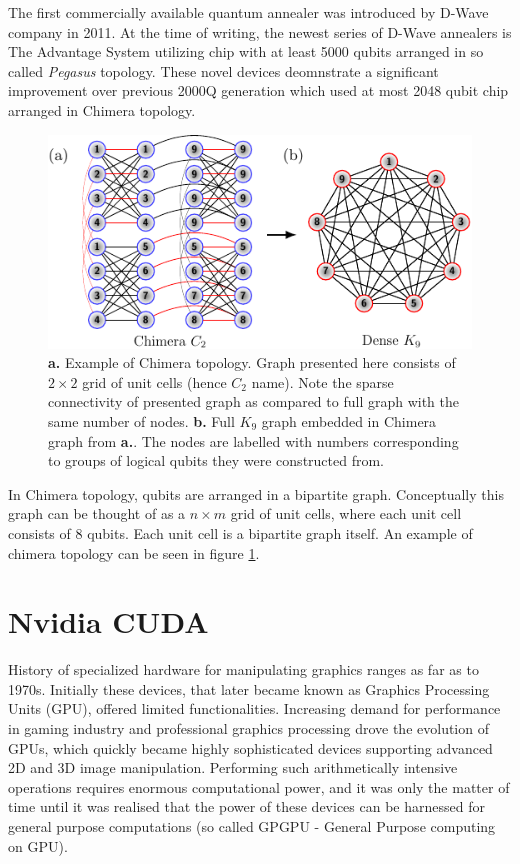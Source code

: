 The first commercially available quantum annealer was introduced by D-Wave company in 2011. At the time of writing, the newest series of D-Wave annealers is The Advantage System utilizing chip with at least 5000 qubits arranged in so called \emph{Pegasus} topology. These novel devices deomnstrate a significant improvement over previous 2000Q generation which used at most 2048 qubit chip arranged in Chimera topology.

\begin{figure}[h]
    \centering
    \includegraphics[width=\textwidth]{figures/chimera.pdf}
    \caption{\textbf{a.} Example of Chimera topology. Graph presented here consists of $2 \times 2$ grid of unit cells (hence $C_2$ name). Note the sparse connectivity of presented graph as compared to full graph with the same number of nodes. \textbf{b.} Full $K_9$ graph embedded in Chimera graph from \textbf{a.}. The nodes are labelled with numbers corresponding to groups of logical qubits they were constructed from.}
    \label{fig:chimera}
\end{figure}

In Chimera topology, qubits are arranged in a bipartite graph. Conceptually this graph can be thought of as a $n \times m$ grid of unit cells, where each unit cell consists of $8$ qubits. Each unit cell is a bipartite graph itself. An example of chimera topology can be seen in figure \ref{fig:chimera}.

\section{Nvidia CUDA}
History of specialized hardware for manipulating graphics ranges as far as to 1970s. Initially these devices, that later became known as Graphics Processing Units (GPU), offered limited functionalities. Increasing demand for performance in gaming industry and professional graphics processing drove the evolution of GPUs, which quickly became highly sophisticated devices supporting advanced 2D and 3D image manipulation. Performing such arithmetically intensive operations requires enormous computational power, and it was only the matter of time until it was realised that the power of these devices can be harnessed for general purpose computations (so called GPGPU - General Purpose computing on GPU). 

